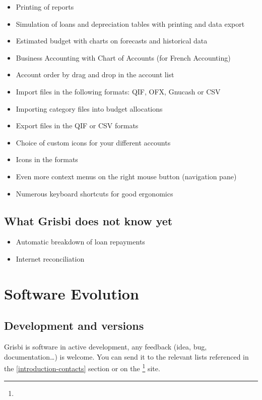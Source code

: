 \begin{itemize}
	\item Printing of reports
	\item Simulation of loans and depreciation tables with printing and data export
	\item Estimated budget with charts on forecasts and historical data
	\item Business Accounting with Chart of Accounts (for French Accounting)
	\item Account order by drag and drop in the account list
	\item Import files in the following formats: \gls{QIF}, \gls{OFX}, \gls{Gnucash} or \gls{CSV}
	\item Importing category files into budget allocations
	\item Export files in the \gls{QIF} or \gls{CSV} formats
	\item Choice of custom icons for your different accounts
	\item Icons in the  formats
	\item Even more context menus on the right mouse button (navigation pane)
	\item Numerous keyboard shortcuts for good ergonomics
\end{itemize}

\subsection{What Grisbi does not know yet}

\begin{itemize}
	\item Automatic breakdown of loan repayments
	\item Internet reconciliation
\end{itemize}

\section{Software Evolution}

\subsection{Development and versions}

Grisbi is software in active development, any feedback (idea, bug, documentation\dots{}) is welcome. You can send it to the relevant lists referenced in the  \vref{introduction-contacts}  section or on the  \footnote{\urlGrisbi{}} site.


